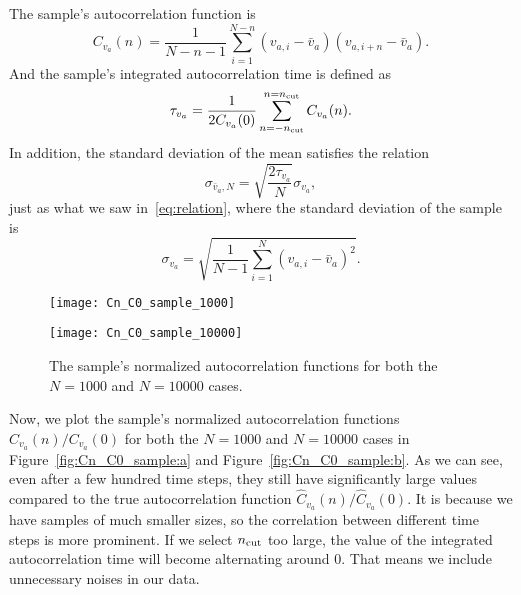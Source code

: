 The sample's autocorrelation function is
%
\begin{equation}\label{eq:sampleautocor}
    C_{v_a}(n) = \frac{ 1 }{ N - n - 1 }
    \sum_{i=1}^{N-n} (v_{a,i} - \bar{v}_a) (v_{a,i + n} - \bar{v}_a).
\end{equation}
%
And the sample's integrated autocorrelation time is defined as
%
\begin{equation}\label{eq:sampletau}
    \tau_{v_a} = \frac{ 1 }{ 2 C_{v_a}(0) }
    \sum_{n=-n_\textnormal{cut}}^{n=n_\textnormal{cut}} C_{v_a}(n).
\end{equation}
%
In addition, the standard deviation of the mean satisfies the relation
%
\begin{equation}\label{eq:samplesigma}
    \sigma_{\bar{v}_a,N} = \sqrt{\frac{ 2\tau_{v_a} }{ N }} \sigma_{v_a},
\end{equation}
%
just as what we saw in~\eqref{eq:relation}, where the standard deviation of the sample is
%
\begin{equation}
    \sigma_{v_a} = \sqrt{\frac{ 1 }{ N - 1 } \sum_{i=1}^N (v_{a,i} - \bar{v}_a)^2}.
\end{equation}

\begin{figure}
    \centering
    \begin{minipage}[t]{0.8\linewidth}
        \centering
        \texttt{[image: Cn\_C0\_sample\_1000]}
        \label{fig:Cn_C0_sample:a}
    \end{minipage}
    \hfill
    \begin{minipage}[t]{0.8\linewidth}
        \centering
        \texttt{[image: Cn\_C0\_sample\_10000]}
        \label{fig:Cn_C0_sample:b}
    \end{minipage}
    \caption{The sample's normalized autocorrelation functions
        for both the \(N = 1000\) and \(N = 10000\) cases.}
    \label{fig:Cn_C0_sample}
\end{figure}

Now, we plot the sample's normalized autocorrelation functions \(C_{v_a}(n) / C_{v_a}(0)\)
for both the \(N = 1000\) and \(N = 10000\) cases in Figure~\ref{fig:Cn_C0_sample:a}
and Figure~\ref{fig:Cn_C0_sample:b}.
As we can see, even after a few hundred time steps, they still have significantly large
values compared to the true autocorrelation function \(\hat{C}_{v_a}(n) / \hat{C}_{v_a}(0)\).
It is because we have samples of much smaller sizes, so the correlation between
different time steps is more prominent.
If we select \(n_\textnormal{cut}\) too large, the value of the
integrated autocorrelation time will become alternating around \(0\).
That means we include unnecessary noises in our data.

